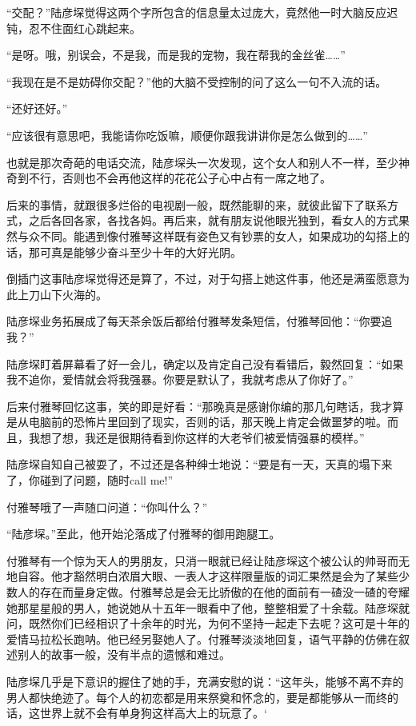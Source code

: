 \documentclass[11pt,a4paper]{article}
\begin{document}
“交配？”陆彦堔觉得这两个字所包含的信息量太过庞大，竟然他一时大脑反应迟钝，忍不住面红心跳起来。﻿﻿

“是呀。哦，别误会，不是我，而是我的宠物，我在帮我的金丝雀……”﻿﻿

“我现在是不是妨碍你交配？”他的大脑不受控制的问了这么一句不入流的话。﻿﻿

“还好还好。”﻿

“应该很有意思吧，我能请你吃饭嘛，顺便你跟我讲讲你是怎么做到的……”﻿﻿

也就是那次奇葩的电话交流，陆彦堔头一次发现，这个女人和别人不一样，至少神奇到不行，否则也不会再他这样的花花公子心中占有一席之地了。﻿﻿

后来的事情，就跟很多烂俗的电视剧一般，既然能聊的来，就彼此留下了联系方式，之后各回各家，各找各妈。再后来，就有朋友说他眼光独到，看女人的方式果然与众不同。能遇到像付雅琴这样既有姿色又有钞票的女人，如果成功的勾搭上的话，那可真是能够少奋斗至少十年的大好光阴。﻿﻿

倒插门这事陆彦堔觉得还是算了，不过，对于勾搭上她这件事，他还是满蛮愿意为此上刀山下火海的。﻿﻿

陆彦堔业务拓展成了每天茶余饭后都给付雅琴发条短信，付雅琴回他：“你要追我？”﻿﻿

陆彦堔盯着屏幕看了好一会儿，确定以及肯定自己没有看错后，毅然回复：“如果我不追你，爱情就会将我强暴。你要是默认了，我就考虑从了你好了。”﻿﻿

后来付雅琴回忆这事，笑的即是好看：“那晚真是感谢你编的那几句瞎话，我才算是从电脑前的恐怖片里回到了现实，否则的话，那天晚上肯定会做噩梦的啦。而且，我想了想，我还是很期待看到你这样的大老爷们被爱情强暴的模样。”﻿﻿

陆彦堔自知自己被耍了，不过还是各种绅士地说：“要是有一天，天真的塌下来了，你碰到了问题，随时call me!”﻿﻿

付雅琴哦了一声随口问道：“你叫什么？”﻿﻿

“陆彦堔。”至此，他开始沦落成了付雅琴的御用跑腿工。﻿﻿

付雅琴有一个惊为天人的男朋友，只消一眼就已经让陆彦堔这个被公认的帅哥而无地自容。他才豁然明白浓眉大眼、一表人才这样限量版的词汇果然是会为了某些少数人的存在而量身定做。付雅琴总是会无比骄傲的在他的面前有一碴没一碴的夸耀她那星星般的男人，她说她从十五年一眼看中了他，整整相爱了十余载。陆彦堔就问，既然你们已经相识了十余年的时光，为何不坚持一起走下去呢？这可是十年的爱情马拉松长跑呐。他已经另娶她人了。付雅琴淡淡地回复，语气平静的仿佛在叙述别人的故事一般，没有半点的遗憾和难过。﻿﻿

陆彦堔几乎是下意识的握住了她的手，充满安慰的说：“这年头，能够不离不弃的男人都快绝迹了。每个人的初恋都是用来祭奠和怀念的，要是都能够从一而终的话，这世界上就不会有单身狗这样高大上的玩意了。‘﻿﻿
\end{document}
